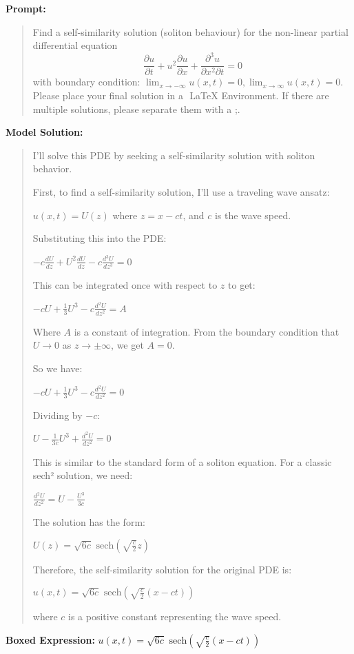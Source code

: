 \documentclass{article}
\begin{document}
\textbf{Prompt:}
\begin{quote}
Find a self-similarity solution (soliton behaviour) for the non-linear partial differential equation $$\frac{\partial u}{\partial t} + u^2 \frac{\partial u}{\partial x} + \frac{\partial^3 u}{\partial x^2 \partial t} = 0$$ with boundary condition: $\lim_{x \to -\infty} u(x,t) = 0,\lim_{x \to \infty} u(x,t) = 0$. Please place your final solution in a $\boxed{}$ LaTeX Environment. If there are multiple solutions, please separate them with a ;.
\end{quote}
\textbf{Model Solution:}
\begin{quote}
I'll solve this PDE by seeking a self-similarity solution with soliton behavior.



First, to find a self-similarity solution, I'll use a traveling wave ansatz:

$u(x,t) = U(z)$ where $z = x - ct$, and $c$ is the wave speed.



Substituting this into the PDE:

$-c\frac{dU}{dz} + U^2\frac{dU}{dz} - c\frac{d^3U}{dz^3} = 0$



This can be integrated once with respect to $z$ to get:

$-cU + \frac{1}{3}U^3 - c\frac{d^2U}{dz^2} = A$



Where $A$ is a constant of integration. From the boundary condition that $U \to 0$ as $z \to \pm\infty$, we get $A = 0$.



So we have:

$-cU + \frac{1}{3}U^3 - c\frac{d^2U}{dz^2} = 0$



Dividing by $-c$:

$U - \frac{1}{3c}U^3 + \frac{d^2U}{dz^2} = 0$



This is similar to the standard form of a soliton equation. For a classic sech² solution, we need:

$\frac{d^2U}{dz^2} = U - \frac{U^3}{3c}$



The solution has the form:

$U(z) = \sqrt{6c}\text{ sech}(\sqrt{\frac{c}{2}}z)$



Therefore, the self-similarity solution for the original PDE is:



$\boxed{u(x,t) = \sqrt{6c}\text{ sech}(\sqrt{\frac{c}{2}}(x-ct))}$



where $c$ is a positive constant representing the wave speed.
\end{quote}
\textbf{Boxed Expression:} $u(x,t) = \sqrt{6c}\text{ sech}(\sqrt{\frac{c}{2}}(x-ct))$
\end{document}

